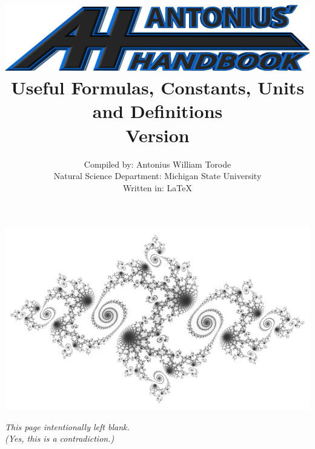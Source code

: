 \documentclass[openany,twoside, notitlepage,letterpaper,11pt]{book}
\title{\includegraphics[scale=.2]{./Images/Covers/AH2.png}
	\\ \vspace{1.5cm} Useful Formulas, Constants, Units and Definitions \\ Version \Version}
\date{}
\author{Compiled by: Antonius William Torode\\ Natural Science Department: Michigan State University \\ Written in: \LaTeX}
\begin{document}
\frontmatter
\maketitle
\thispagestyle{empty}
\pagestyle{empty}
\begin{center}
	\includegraphics[scale=.4]{./Images/Covers/background.png}
\end{center}





\thispagestyle{empty}
\newpage
{}
\begin{center}
	\textit{This page intentionally left blank.\\ (Yes, this is a contradiction.)}
\end{center}

\tableofcontents


\setlength{\parindent}{0pt}
\mainmatter
\pagestyle{fancy}


\newpage


\newpage


\newpage


\newpage
	

\newpage


\newpage


\newpage

\end{document}
